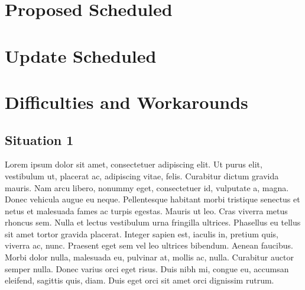 \documentclass[12pt]{partialreport}
\begin{document}
\maketitle
\content

\section*{Proposed Scheduled}
\oldScheduleTable

\section*{Update Scheduled}
\newScheduleTable

\section*{Difficulties and Workarounds}
\subsection*{Situation 1}
Lorem ipsum dolor sit amet, consectetuer adipiscing elit. Ut purus elit, vestibulum ut,
placerat ac, adipiscing vitae, felis. Curabitur dictum gravida mauris. Nam arcu libero, nonummy
eget, consectetuer id, vulputate a, magna. Donec vehicula augue eu neque. Pellentesque habitant
morbi tristique senectus et netus et malesuada fames ac turpis egestas. Mauris ut leo. Cras
viverra metus rhoncus sem. Nulla et lectus vestibulum urna fringilla ultrices. Phasellus eu tellus
sit amet tortor gravida placerat. Integer sapien est, iaculis in, pretium quis, viverra ac, nunc.
Praesent eget sem vel leo ultrices bibendum. Aenean faucibus. Morbi dolor nulla, malesuada
eu, pulvinar at, mollis ac, nulla. Curabitur auctor semper nulla. Donec varius orci eget risus.
Duis nibh mi, congue eu, accumsan eleifend, sagittis quis, diam. Duis eget orci sit amet orci
dignissim rutrum.
\end{document}
